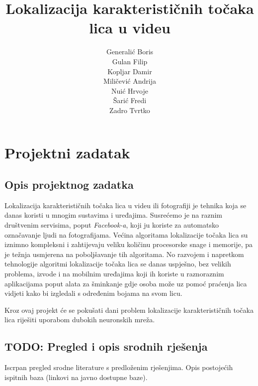 \documentclass[times, utf8, zavrsni, numeric]{fer}
\begin{document}
\title{ Lokalizacija karakterističnih točaka lica u videu }

\author{ \begin{tabular}{ l }
	Generalić Boris \\
	Gulan Filip \\
	Kopljar Damir \\
	Miličević Andrija \\
	Nuić Hrvoje \\
	Šarić Fredi \\
	Zadro Tvrtko \\
\end{tabular}  }

\maketitle
\tableofcontents

\chapter{Projektni zadatak}

\section{Opis projektnog zadatka}

Lokalizacija karakterističnih točaka lica u videu ili fotografiji je tehnika koja se danas koristi u mnogim sustavima i uređajima. Susrećemo je na raznim društvenim servisima, poput \textit{Facebook-a}, koji ju koriste za automatsko označavanje ljudi na fotografijama. Većina algoritama lokalizacije točaka lica su iznimno kompleksni i zahtijevaju veliku količinu procesorske snage i memorije, pa je težnja usmjerena na poboljšavanje tih algoritama. No razvojem i napretkom tehnologije algoritmi lokalizacije točaka lica se danas uspješno, bez velikih problema, izvode i na mobilnim uređajima koji ih koriste u raznoraznim aplikacijama poput alata za šminkanje gdje osoba može uz pomoć praćenja lica vidjeti kako bi izgledali s određenim bojama na svom licu.

Kroz ovaj projekt će se pokušati dani problem lokalizacije karakterističnih točaka lica riješiti uporabom dubokih neuronskih mreža.

\section{TODO: Pregled i opis srodnih rješenja}

Iscrpan pregled srodne literature s predloženim rješenjima. Opis postojećih ispitnih baza (linkovi na javno dostupne baze).
\end{document}
